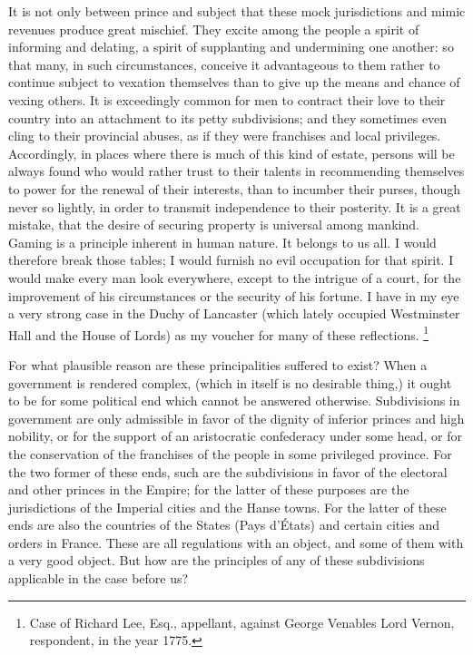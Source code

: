 It is not only between prince and subject that these mock jurisdictions and mimic revenues produce great mischief. They excite among the people a spirit of informing and delating, a spirit of supplanting and undermining one another: so that many, in such circumstances, conceive it advantageous to them rather to continue subject to vexation themselves than to give up the means and chance of vexing others. It is exceedingly common for men to contract their love to their country into an attachment to its petty subdivisions; and they sometimes even cling to their provincial abuses, as if they were franchises and local privileges. Accordingly, in places where there is much of this kind of estate, persons will be always found who would rather trust to their talents in recommending themselves to power for the renewal of their interests, than to incumber their purses, though never so lightly, in order to transmit independence to their posterity. It is a great mistake, that the desire of securing property is universal among mankind. Gaming is a principle inherent in human nature. It belongs to us all. I would therefore break those tables; I would furnish no evil occupation for that spirit. I would make every man look everywhere, except to the intrigue of a court, for the improvement of his circumstances or the security of his fortune. I have in my eye a very strong case in the Duchy of Lancaster (which lately occupied Westminster Hall and the House of Lords) as my voucher for many of these reflections.
\footnote{ Case of Richard Lee, Esq., appellant, against George Venables Lord Vernon, respondent, in the year 1775.}


For what plausible reason are these principalities suffered to exist? When a government is rendered complex, (which in itself is no desirable thing,) it ought to be for some political end which cannot be answered otherwise. Subdivisions in government are only admissible in favor of the dignity of inferior princes and high nobility, or for the support of an aristocratic confederacy under some head, or for the conservation of the franchises of the people in some privileged province. For the two former of these ends, such are the subdivisions in favor of the electoral and other princes in the Empire; for the latter of these purposes are the jurisdictions of the Imperial cities and the Hanse towns. For the latter of these ends are also the countries of the States (Pays d'États) and certain cities and orders in France. These are all regulations with an object, and some of them with a very good object. But how are the principles of any of these subdivisions applicable in the case before us?


